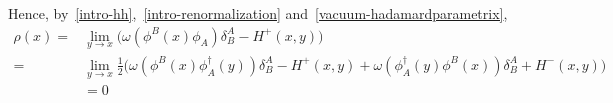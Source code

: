 Hence, by~\cref{intro-hh},~\cref{intro-renormalization} and~\cref{vacuum-hadamardparametrix}, 
\begin{equation*}
\begin{split}
\rho(x) = & \lim_{y\rightarrow x}\big(\omega(\phi^B(x)\phi_A)\delta^A_B - H^+(x,y)\big) \\
= & \lim_{y\rightarrow x}\frac{1}{2}\big( \omega(\phi^B(x)\phi_A^\dagger(y))\delta^A_B-H^+(x,y) + \omega(\phi_A^\dagger(y)\phi^B(x))\delta^A_B + H^-(x,y) \big)  \\
& = 0
\end{split} 
\end{equation*}
%
